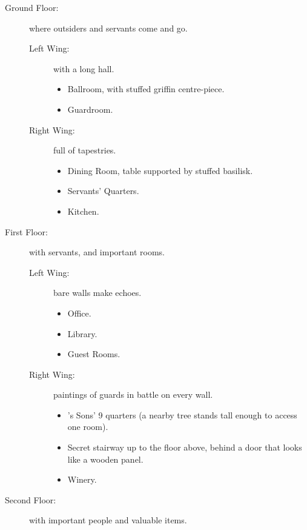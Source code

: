 \begin{multicols}{2}
\begin{description}
  \item[Ground Floor:]
  where outsiders and servants come and go.
    \begin{description}
      \item[Left Wing:]
      with a long hall.
      \begin{itemize}
        \item
        Ballroom, with stuffed griffin centre-piece.
        \item
        Guardroom.
      \end{itemize}
      \item[Right Wing:]
      full of tapestries.
      \begin{itemize}
        \item
        Dining Room, table supported by stuffed \gls{basilisk}.
        \item
        Servants' Quarters.
        \item
        Kitchen.
      \end{itemize}
    \end{description}
  \item[First Floor:]
  with servants, and important rooms.
    \begin{description}
      \item[Left Wing:]
      bare walls make echoes.
      \begin{itemize}
        \item
        Office.
        \item
        Library.
        \item
        Guest Rooms.
      \end{itemize}
      \item[Right Wing:]
      paintings of \glspl{guard} in battle on every wall.
      \begin{itemize}
        \item
        's Sons' 9 quarters (a nearby tree stands tall enough to access one room).
        \item
        Secret stairway up to the floor above, behind a door that looks like a wooden panel.
        \item
        Winery.
      \end{itemize}
    \end{description}
  \item[Second Floor:]
  with important people and valuable items.
    \begin{description}

\end{description}
\end{description}
\end{multicols}

